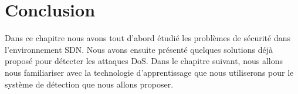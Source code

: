 \newpage
\section{Conclusion}
Dans ce chapitre nous avons tout d’abord étudié les problèmes de sécurité dans l’environnement SDN. Nous avons ensuite présenté quelques solutions déjà proposé pour détecter les attaques DoS. Dans le chapitre suivant, nous allons nous familiariser avec la technologie d’apprentissage que nous utiliserons pour le système de détection que nous allons proposer. 
